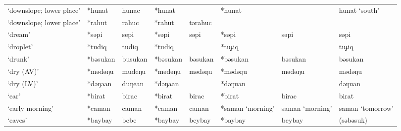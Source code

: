 \begin{landscape}
\begin{longtable}[c]{@{}p{3cm}<{\raggedright}p{2.75cm}<{\raggedright}p{2.75cm}<{\raggedright}p{2.75cm}<{\raggedright}p{2.75cm}<{\raggedright}p{2.75cm}<{\raggedright}p{2.75cm}<{\raggedright}p{2.75cm}<{\raggedright}@{}}
`downslope; lower place'                             & *hunat       & hunac                         & *hunat         &                            & *hunat           &                          & hunat `south'                     \\
`downslope; lower place'                             & *rahut       & rahuc                         & *rahut         & tərahuc                    &                  &                          &                                   \\
`dream'                                              & *səpi        & sepi                          & *səpi          & səpi                       & *səpi            & səpi                     & səpi                              \\
`droplet'                                            & *tudiq       & tudiq                         & *tudiq         &                            & *tuɟiq           &                          & tuɟiq                             \\
`drunk'                                              & *bəsukan     & busukan                       & *bəsukan       & bəsukan                    & *bəsukan         & bəsukan                  & bəsukan                           \\
`dry (AV)'                                           & *mədəŋu      & mudeŋu                        & *mədəŋu        & mədəŋu                     & *mədəŋu          & mədəŋu                   & mədəŋu                            \\
`dry (LV)'                                           & *dəŋəan      & duŋean                        & *dəŋaan        &                            & *dəŋuan          &                          & dəŋuan                            \\
`ear'                                                & *birat       & birac                         & *birat         & birac                      & *birat           & birac                    & birat                             \\
`early morning'                                      & *caman       & caman                         & *caman         & caman                      & *saman `morning' & saman `morning'          & saman `tomorrow'                  \\
`eaves'                                              & *baybay      & bebe                          & *baybay        & beybay                     & *baybay          & beybay                   & (səbəsuk)                         \\

\end{longtable}
\end{landscape}
